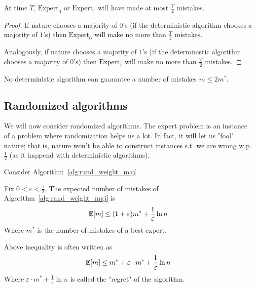     \begin{claim}
        At time $T$, $\text{Expert}_0$ or $\text{Expert}_1$ will have made at most $\frac{T}{2}$ mistakes.
    \end{claim}

    \begin{proof}
        If nature chooses a majority of $0$'s (if the deterministic algorithm chooses a majority of $1$'s) then $\text{Expert}_0$ will make no more than $\frac{T}{2}$ mistakes.

        Analogously, if nature chooses a majority of $1$'s (if the deterministic algorithm chooses a majority of $0$'s) then $\text{Expert}_1$ will make no more than $\frac{T}{2}$ mistakes.
    \end{proof}

    \begin{corollary}
        No deterministic algorithm can guarantee a number of mistakes $m \leq 2 m^*$.
    \end{corollary}


\subsection{Randomized algorithms}

    We will now consider randomized algorithms.
    The expert problem is an instance of a problem where randomization helps us a lot.
    In fact, it will let us "fool" nature; that is, nature won't be able to construct instances s.t. we are wrong w.p. $\frac{1}{2}$ (as it happend with deterministic algorithms).

    Consider Algorithm~\ref{alg:rand_weight_maj}.

    

    \begin{theorem}
        Fix $0 < \varepsilon < \frac{1}{2}$. The expected number of mistakes of Algorithm~\ref{alg:rand_weight_maj} is
        \[ \mathbb{E}[m] \leq (1 + \varepsilon)m^* + \frac{1}{\varepsilon} \ln n \]
        Where $m^*$ is the number of mistakes of a best expert.
    \end{theorem}

    Above inequality is often written as
    \[ \mathbb{E}[m] \leq m^* + \varepsilon \cdot m^* + \frac{1}{\varepsilon} \ln n \]
    Where $\varepsilon \cdot m^* + \frac{1}{\varepsilon} \ln n$ is called the "regret" of the algorithm.

